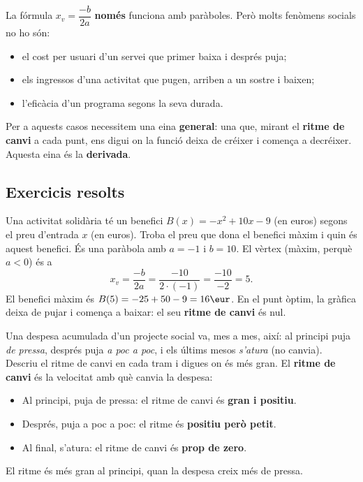 \begin{exemple}
La fórmula $x_v=\dfrac{-b}{2a}$ \textbf{només} funciona amb paràboles. Però molts
fenòmens socials no ho són:
\begin{itemize}[leftmargin=1.4em, itemsep=2pt]
  \item el cost per usuari d'un servei que primer baixa i després puja;
  \item els ingressos d'una activitat que pugen, arriben a un sostre i baixen;
  \item l'eficàcia d'un programa segons la seva durada.
\end{itemize}
Per a aquests casos necessitem una eina \textbf{general}: una que, mirant el
\textbf{ritme de canvi} a cada punt, ens digui on la funció deixa de créixer i comença
a decréixer. Aquesta eina és la \textbf{derivada}.
\end{exemple}

\subsection{Exercicis resolts}

\begin{exresolt}
Una activitat solidària té un benefici $B(x)=-x^2+10x-9$ (en euros) segons el preu
d'entrada $x$ (en euros). Troba el preu que dona el benefici màxim i quin és aquest
benefici.
\solucio
És una paràbola amb $a=-1$ i $b=10$. El vèrtex (màxim, perquè $a<0$) és a
\[
x_v=\frac{-b}{2a}=\frac{-10}{2\cdot(-1)}=\frac{-10}{-2}=5.
\]
El benefici màxim és $B(5)=-25+50-9=16\eur$. En el punt òptim, la gràfica deixa de
pujar i comença a baixar: el seu \textbf{ritme de canvi} és nul.
\end{exresolt}

\begin{exresolt}
Una despesa acumulada d'un projecte social va, mes a mes, així: al principi puja
\emph{de pressa}, després puja \emph{a poc a poc}, i els últims mesos \emph{s'atura}
(no canvia). Descriu el ritme de canvi en cada tram i digues on és més gran.
\solucio
El \textbf{ritme de canvi} és la velocitat amb què canvia la despesa:
\begin{itemize}[leftmargin=1.4em, itemsep=2pt]
  \item Al principi, puja de pressa: el ritme de canvi és \textbf{gran i positiu}.
  \item Després, puja a poc a poc: el ritme és \textbf{positiu però petit}.
  \item Al final, s'atura: el ritme de canvi és \textbf{prop de zero}.
\end{itemize}
El ritme és més gran al principi, quan la despesa creix més de pressa.
\end{exresolt}

